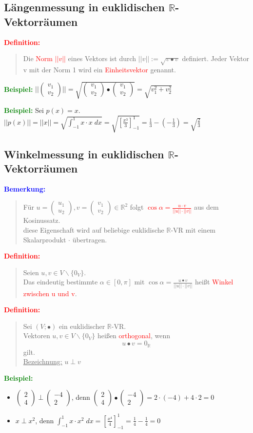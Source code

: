 \documentclass{article}
\newcommand{\red}[1]{\textcolor{red}{#1}}
\newcommand{\blue}[1]{\textcolor{blue}{#1}}
\newcommand{\green}[1]{\textcolor{green}{#1}}
\newcommand{\ex}{\green{\textbf{Beispiel: }}}
\newcommand{\de}[1]{\red{\textbf{Definition: }}\begin{quote}#1\end{quote}}
\newcommand{\an}[1]{\blue{\textbf{Bemerkung: }}\begin{quote}#1\end{quote}}
\newcommand{\R}{\mathbb{R}}
\newcommand{\no}[1]{||#1||}
\newcommand{\vvec}[2]{\begin{pmatrix}#1\\#2\end{pmatrix}}
\begin{document}
\subsection{\texorpdfstring{Längenmessung in euklidischen $\R$-Vektorräumen}{Längenmessung in euklidischen R-Vektorräumen}}

\de{
    Die \red{Norm} \red{$\no{v}$} eines Vektors ist durch $\no{v} := \sqrt{v \bullet v}$ definiert. Jeder Vektor v mit der Norm 1 wird ein \red{Einheitsvektor} genannt.
}

\ex $\no{\vvec{v_1}{v_2}} = \sqrt{\vvec{v_1}{v_2} \bullet \vvec{v_1}{v_2}} = \sqrt{v_1^2 + v_2^2}$

\ex Sei $p(x) = x$.\\
$\no{p(x)} = \no{x} = \sqrt{\int_{-1}^{1} x \cdot x \; dx} = \sqrt{[\frac{x^3}{3}]_{-1}^1} = \frac{1}{3} - (- \frac{1}{3}) = \sqrt{\frac{2}{3}}$

\subsection{\texorpdfstring{Winkelmessung in euklidischen $\R$-Vektorräumen}{Winkelmessung in euklidischen R-Vektorräumen}}

\an{
    Für $u = \vvec{u_1}{u_2}, v = \vvec{v_1}{v_2} \in \R^2$ folgt \red{$\cos \alpha = \frac{u \cdot v}{\no{u} \cdot \no{v}}$} aus dem Kosinussatz.\\
    diese Eigenschaft wird auf beliebige euklidische $\R$-VR mit einem Skalarprodukt $\cdot$ übertragen.
}

\de{
    Seien $u,v \in V \backslash \{0_V\}$.\\
    Das eindeutig bestimmte $\alpha \in [0, \pi]$ mit $\cos \alpha = \frac{u \bullet v}{\no{u} \cdot \no{v}}$ heißt \red{Winkel zwischen u und v}.
}

\newpage
\de{
    Sei $(V; \bullet)$ ein euklidischer $\R$-VR.\\
    Vektoren $u,v \in V \backslash \{0_V\}$ heißen \red{orthogonal}, wenn
    \[
        u \bullet v = 0_{\R}
    \]
    gilt.\\
    \underline{Bezeichnung:} $u \perp v$
}

\ex \begin{itemize}
    \item $\vvec{2}{4} \perp \vvec{-4}{2}$, denn $\vvec{2}{4} \bullet \vvec{-4}{2} = 2 \cdot (-4) + 4 \cdot 2 = 0$
    \item $x \perp x^2$, denn $\int_{-1}^{1} x \cdot x^2 \; dx = [\frac{x^4}{4}]_{-1}^1 = \frac{1}{4} - \frac{1}{4} = 0$
\end{itemize}
\end{document}
